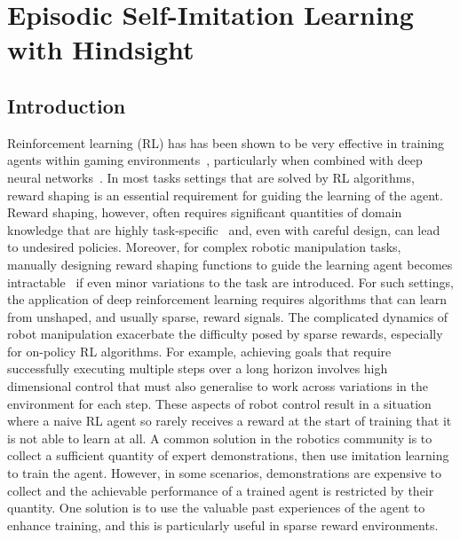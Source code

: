 \chapter{Episodic Self-Imitation Learning with Hindsight}
\section{Introduction}
Reinforcement learning (RL) has has been shown to be very effective in training agents within gaming environments~\cite{mnih2015human,silver2016mastering}, particularly when combined with deep neural networks~\cite{lecun2015deep,silver2016mastering,liu2017survey}. In most tasks settings that are solved by RL algorithms, reward shaping is an essential requirement for guiding the learning of the  agent. Reward shaping, however, often requires significant quantities of domain knowledge that {are} highly task-specific~\cite{ng1999policy} and, even with careful design, can lead to undesired policies. Moreover, for complex robotic manipulation tasks, manually designing  reward shaping functions to guide the learning agent becomes intractable~\cite{arulkumaran2017deep,florensa2017reverse} if even minor variations to the task are introduced. For such settings, the application of deep reinforcement learning requires algorithms that can learn from unshaped, and usually sparse, reward signals. The complicated dynamics of robot manipulation exacerbate the difficulty posed by sparse rewards, especially for on-policy RL algorithms. For example, achieving goals that require successfully executing multiple steps over a long horizon involves high dimensional control {that must also generalise to work across variations in the environment for each step}. These aspects of robot control result in a situation where a naive RL agent so rarely receives a reward at the start of training that it is not able to learn at all. A common solution in the robotics community is to collect a sufficient quantity of expert demonstrations, then use imitation learning to train the agent. However, in some scenarios, demonstrations are expensive to collect and the achievable performance of a trained agent is restricted by their quantity. One solution is to use the valuable past experiences of the agent to enhance training, and this is particularly useful in sparse reward environments.

